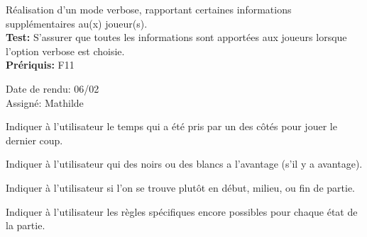 \documentclass{article}
\begin{document}
\begin{needbox}
    Réalisation d'un mode verbose, rapportant certaines informations supplémentaires au(x) joueur(s).\\
    \textbf{Test:} S'assurer que toutes les informations sont apportées aux joueurs lorsque l'option
    verbose est choisie.\\
    \textbf{Prériquis:} F11
    \begin{duedatebox}
        Date de rendu: 06/02\\
        Assigné: Mathilde
    \end{duedatebox}
    \begin{subneedbox}
        Indiquer à l'utilisateur le temps qui a été pris par un des côtés pour jouer le dernier coup.
    \end{subneedbox}
    \begin{subneedbox}
        Indiquer à l'utilisateur qui des noirs ou des blancs a l'avantage (s'il y a avantage).
    \end{subneedbox}
    \begin{subneedbox}
        Indiquer à l'utilisateur si l'on se trouve plutôt en début, milieu, ou fin de partie.
    \end{subneedbox}
    \begin{subneedbox}
        Indiquer à l'utilisateur les règles spécifiques encore possibles pour chaque état de la partie.
    \end{subneedbox}
\end{needbox}
    
\end{document}
